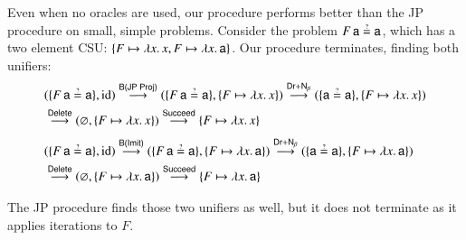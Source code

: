 \begin{exa}
  Even when no oracles are used, our procedure performs better than the JP procedure on small, simple
  problems. Consider the problem $F \, \cst{a} \unif \cst{a}$, which has a two
  element CSU: $\{ F \mapsto \lambda x. \, x, F \mapsto \lambda x. \, \mathsf{a}
  \}$. Our procedure terminates, finding both unifiers:
\begin{align*}
    &
    (\{ F \, \cst{a} \unif \cst{a} \}, \makeop{id})
    \overset{\textsf{B(JP Proj)}}{\newunifarrow}
    (\{ F \, \cst{a} \unif \cst{a} \},  \{ F \mapsto \lambda x. \, x \} )
    \overset{\textsf{Dr}+\textsf{N}_\beta}{\newunifarrow}
    (\{ \cst{a} \unif \cst{a} \}, \{  F \mapsto \lambda x. \, x \})
    \\ &
    \overset{\textsf{Delete}}{\newunifarrow}
    (\varnothing, \{  F \mapsto \lambda x. \, x \})
    \overset{\textsf{Succeed}}{\newunifarrow}
    \{  F \mapsto \lambda x. \, x \}
    \\[1\jot]
    &
    (\{ F \, \cst{a} \unif \cst{a} \}, \makeop{id})
    \overset{\textsf{B(Imit)}}{\newunifarrow}
    (\{ F \, \cst{a} \unif \cst{a} \},  \{ F \mapsto \lambda x. \, \cst{a} \} )
    \overset{\textsf{Dr}+\textsf{N}_\beta}{\newunifarrow}
    (\{ \cst{a} \unif \cst{a} \}, \{  F \mapsto \lambda x. \, \cst{a} \})
    \\ &
    \overset{\textsf{Delete}}{\newunifarrow}
    (\varnothing, \{  F \mapsto \lambda x. \, \cst{a} \})
    \overset{\textsf{Succeed}}{\newunifarrow}
    \{  F \mapsto \lambda x. \, \cst{a} \}
\end{align*}

The JP procedure finds those two unifiers as well, but it does not terminate as
it applies iterations to $F$.


\end{exa}

